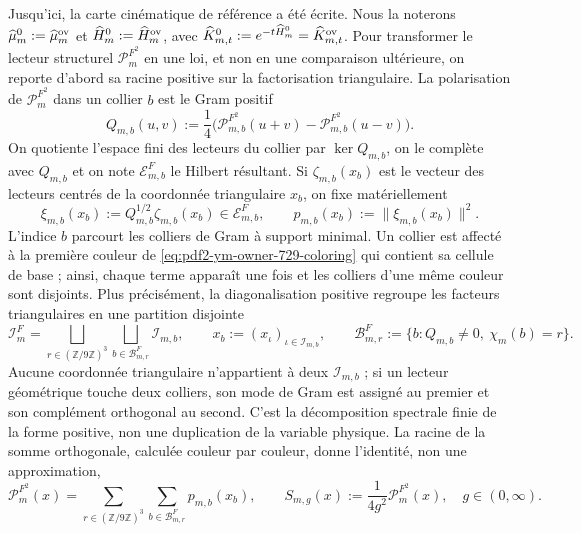 Jusqu’ici, la carte cinématique de référence a été écrite. Nous la noterons
$\widehat\mu_m^0:=\widehat\mu_m^{\rm ov}$ et
$\widehat H_m^0:=\widehat H_m^{\rm ov}$, avec
$\widehat K_{m,t}^0:=e^{-t\widehat H_m^0}=\widehat K_{m,t}^{\rm ov}$.
Pour transformer le lecteur structurel
$\mathcal P_m^{F^2}$ en une loi, et non en une comparaison ultérieure, on reporte
d’abord sa racine positive sur la factorisation triangulaire. La polarisation de
$\mathcal P_m^{F^2}$ dans un collier $b$ est le Gram positif
\[
 Q_{m,b}(u,v):=\frac14\bigl(
 \mathcal P_{m,b}^{F^2}(u+v)-\mathcal P_{m,b}^{F^2}(u-v)
 \bigr).
\]
On quotiente l’espace fini des lecteurs du collier par $\ker Q_{m,b}$, on le complète
avec $Q_{m,b}$ et on note $\mathcal E_{m,b}^{F}$ le Hilbert résultant. Si
$\zeta_{m,b}(x_b)$ est le vecteur des lecteurs centrés de la coordonnée triangulaire
$x_b$, on fixe matériellement
\begin{equation}\label{eq:pdf2-ym-action-root}
 \xi_{m,b}(x_b):=Q_{m,b}^{1/2}\zeta_{m,b}(x_b)
 \in\mathcal E_{m,b}^{F},
 \qquad
 p_{m,b}(x_b):=\|\xi_{m,b}(x_b)\|^2.
\end{equation}
L'indice $b$ parcourt les colliers de Gram à support minimal. Un collier est affecté à la première couleur de \eqref{eq:pdf2-ym-owner-729-coloring} qui contient sa cellule de base ; ainsi, chaque terme apparaît une fois et les colliers d'une même couleur sont disjoints. Plus précisément, la diagonalisation positive regroupe les facteurs triangulaires en une partition disjointe
\begin{equation}\label{eq:pdf2-ym-action-factor-partition}
 \mathcal I_m^{F}
 =\bigsqcup_{r\in(\mathbb Z/9\mathbb Z)^3}
   \bigsqcup_{b\in\mathcal B_{m,r}^{F}}\mathcal I_{m,b},
 \qquad x_b:=(x_\iota)_{\iota\in\mathcal I_{m,b}},
 \qquad
 \mathcal B_{m,r}^{F}:=\{b:Q_{m,b}\ne0,\ \chi_m(b)=r\}.
\end{equation}
Aucune coordonnée triangulaire n’appartient à deux $\mathcal I_{m,b}$ ; si un lecteur
géométrique touche deux colliers, son mode de Gram est assigné au premier et son complément
orthogonal au second. C’est la décomposition spectrale finie de la forme positive,
non une duplication de la variable physique.
La racine de la somme orthogonale, calculée couleur par couleur, donne l’identité, non une
approximation,
\begin{equation}\label{eq:pdf2-ym-action-reader-sum}
 \mathcal P_m^{F^2}(x)
 =\sum_{r\in(\mathbb Z/9\mathbb Z)^3}
   \sum_{b\in\mathcal B_{m,r}^{F}}p_{m,b}(x_b),
 \qquad
 S_{m,g}(x):=\frac1{4g^2}\mathcal P_m^{F^2}(x),
 \quad g\in(0,\infty).
\end{equation}
